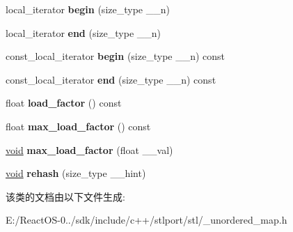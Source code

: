 \begin{DoxyCompactItemize}
\item 
\mbox{\label{classunordered__map_a9aa834c4e8d62b63a68a2262c589bbaa}} 
local\+\_\+iterator {\bfseries begin} (size\+\_\+type \+\_\+\+\_\+n)
\item 
\mbox{\label{classunordered__map_a899f29cbf52fd6fcd1e207c9884fdb64}} 
local\+\_\+iterator {\bfseries end} (size\+\_\+type \+\_\+\+\_\+n)
\item 
\mbox{\label{classunordered__map_a20015fdd95d2180be3599ac6876a28be}} 
const\+\_\+local\+\_\+iterator {\bfseries begin} (size\+\_\+type \+\_\+\+\_\+n) const
\item 
\mbox{\label{classunordered__map_a1e3b186ad244cea1e51eabe0df42d433}} 
const\+\_\+local\+\_\+iterator {\bfseries end} (size\+\_\+type \+\_\+\+\_\+n) const
\item 
\mbox{\label{classunordered__map_a30fe5411d0f1baa9c0566c2e0f2598c3}} 
float {\bfseries load\+\_\+factor} () const
\item 
\mbox{\label{classunordered__map_af8ecdfabfb1eb8b8f201d2d065b6eab1}} 
float {\bfseries max\+\_\+load\+\_\+factor} () const
\item 
\mbox{\label{classunordered__map_a920a9aa6500e9afa14fd18067f65d17c}} 
\hyperlink{interfacevoid}{void} {\bfseries max\+\_\+load\+\_\+factor} (float \+\_\+\+\_\+val)
\item 
\mbox{\label{classunordered__map_ad990d881fbe43ebb9ed9592f866376e6}} 
\hyperlink{interfacevoid}{void} {\bfseries rehash} (size\+\_\+type \+\_\+\+\_\+hint)
\end{DoxyCompactItemize}


该类的文档由以下文件生成\+:\begin{DoxyCompactItemize}
\item 
E\+:/\+React\+O\+S-\/0../sdk/include/c++/stlport/stl/\+\_\+unordered\+\_\+map.\+h\end{DoxyCompactItemize}
